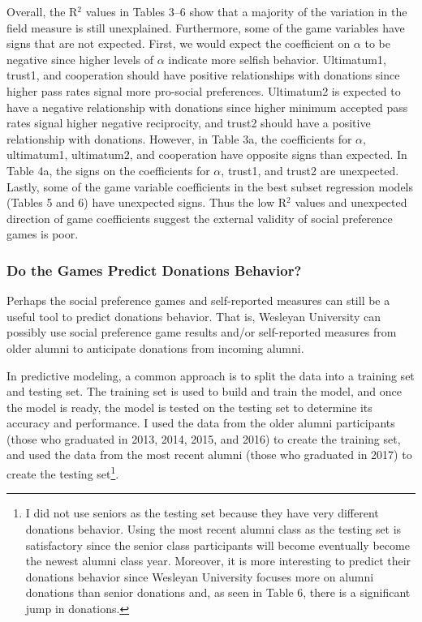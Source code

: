 \documentclass[12pt]{article}
\begin{document}
Overall, the R$^{2}$ values in Tables 3--6 show that a majority of the variation in the field measure is still unexplained. Furthermore, some of the game variables have signs that are not expected. First, we would expect the coefficient on \(\alpha\) to be negative since higher levels of \(\alpha\) indicate more selfish behavior. Ultimatum1, trust1, and cooperation should have positive relationships with donations since higher pass rates signal more pro-social preferences. Ultimatum2 is expected to have a negative relationship with donations since higher minimum accepted pass rates signal higher negative reciprocity, and trust2 should have a positive relationship with donations. However, in Table 3a, the coefficients for \(\alpha\), ultimatum1, ultimatum2, and cooperation have opposite signs than expected. In Table 4a, the signs on the coefficients for \(\alpha\), trust1, and trust2 are unexpected. Lastly, some of the game variable coefficients in the best subset regression models (Tables 5 and 6) have unexpected signs. Thus the low R$^{2}$ values and unexpected direction of game coefficients suggest the external validity of social preference games is poor.


\subsubsection{Do the Games Predict Donations Behavior?}

Perhaps the social preference games and self-reported measures can still be a useful tool to predict donations behavior. That is, Wesleyan University can possibly use social preference game results and/or self-reported measures from older alumni to anticipate donations from incoming alumni.

In predictive modeling, a common approach is to split the data into a training set and testing set. The training set is used to build and train the model, and once the model is ready, the model is tested on the testing set to determine its accuracy and performance. I used the data from the older alumni participants (those who graduated in 2013, 2014, 2015, and 2016) to create the training set, and used the data from the most recent alumni (those who graduated in 2017) to create the testing set\footnote{I did not use seniors as the testing set because they have very different donations behavior. Using the most recent alumni class as the testing set is satisfactory since the senior class participants will become eventually become the newest alumni class year. Moreover, it is more interesting to predict their donations behavior since Wesleyan University focuses more on alumni donations than senior donations and, as seen in Table 6, there is a significant jump in donations.}. 
\end{document}
